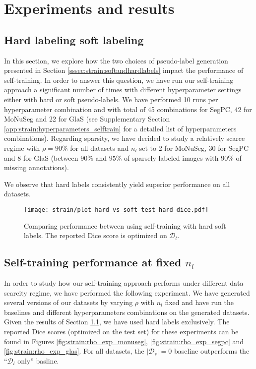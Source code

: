 \section{Experiments and results}
\label{sec:strain:results}

\subsection{Hard labeling \vs soft labeling}
\label{ssec:strain:res:hardvssoft}

In this section, we explore how the two choices of pseudo-label generation presented in Section \ref{sssec:strain:softandhardlabels} impact the performance of self-training. In order to answer this question, we have run our self-training approach a significant number of times with different hyperparameter settings either with hard or soft pseudo-labels. We have performed 10 runs per hyperparameter combination and with total of 45 combinations for SegPC, 42 for MoNuSeg and 22 for GlaS (see Supplementary Section \ref{app:strain:hyperparameters_selftrain} for a detailed list of hyperparameters combinations). Regarding sparsity, we have decided to study a relatively scarce regime with $\rho = 90\%$ for all datasets and $n_l$ set to $2$ for MoNuSeg, $30$ for SegPC and $8$ for GlaS (\ie between $90\%$ and $95\%$ of sparsely labeled images with $90\%$ of missing annotations).    

We observe that hard labels consistently yield superior performance on all datasets. 

\begin{figure}
  \centering
  \texttt{[image: strain/plot\_hard\_vs\_soft\_test\_hard\_dice.pdf]}
  \caption{Comparing performance between using self-training with hard \vs soft labels. The reported Dice score is optimized on $\mathcal{D}_l$.}
  \label{fig:strain:hard_vs_soft}
\end{figure}

\subsection{Self-training performance at fixed $n_l$}

In order to study how our self-training approach performs under different data scarcity regime, we have performed the following experiment. We have generated several versions of our datasets by varying $\rho$ with $n_l$ fixed and have run the baselines and different hyperparameters combinations on the generated datasets. Given the results of Section \ref{ssec:strain:res:hardvssoft}, we have used hard labels exclusively. The reported Dice scores (optimized on the test set) for these experiments can be found in Figures \ref{fig:strain:rho_exp_monuseg}, \ref{fig:strain:rho_exp_segpc} and \ref{fig:strain:rho_exp_glas}. For all datasets, the $|\mathcal{D}_s| = 0$ baseline outperforms the ``$\mathcal{D}_l$ only'' basline. 

